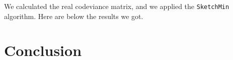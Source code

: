 \documentclass[a4paper]{article}%
\begin{document}
We calculated the real codeviance matrix, and we applied the \texttt{SketchMin} algorithm. Here are below the results we got.

\begin{figure}
	\center
\end{figure}



\section*{Conclusion}

\clearpage
\end{document}
